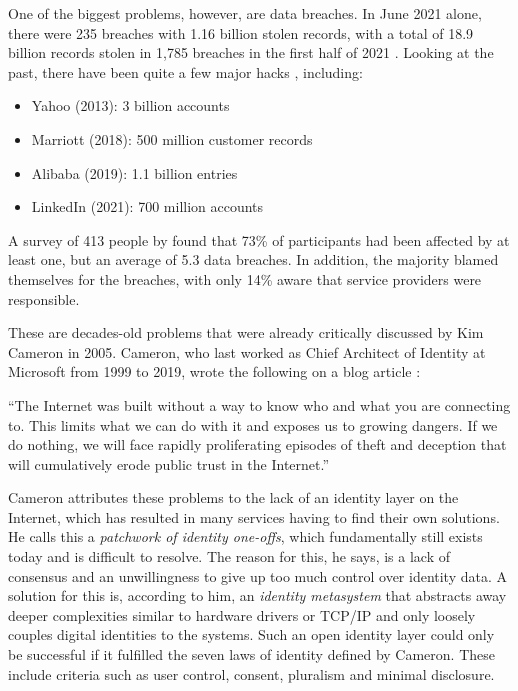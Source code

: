One of the biggest problems, however, are data breaches. In June 2021 alone, there were 235 breaches with 1.16 billion stolen records, with a total of 18.9 billion records stolen in 1,785 breaches in the first half of 2021 \cite{risk_based_security_data_2021}. Looking at the past, there have been quite a few major hacks \cite{swinhoe_15_2021}, including: 

\begin{itemize}
    \item Yahoo (2013): 3 billion accounts
    \item Marriott (2018): 500 million customer records
    \item Alibaba (2019): 1.1 billion entries
    \item LinkedIn (2021): 700 million accounts
\end{itemize}

A survey of 413 people by \cite{mayer_now_2021} found that 73\% of participants had been affected by at least one, but an average of 5.3 data breaches. In addition, the majority blamed themselves for the breaches, with only 14\% aware that service providers were responsible.

These are decades-old problems that were already critically discussed by Kim Cameron in 2005. Cameron, who last worked as Chief Architect of Identity at Microsoft from 1999 to 2019, wrote the following on a blog article \cite{cameron_laws_2005}:

\begin{displayquote}
    “The Internet was built without a way to know who and what you are connecting to. This limits what we can do with it and exposes us to growing dangers. If we do nothing, we will face rapidly proliferating episodes of theft and deception that will cumulatively erode public trust in the Internet.”
\end{displayquote}

Cameron attributes these problems to the lack of an identity layer on the Internet, which has resulted in many services having to find their own solutions. He calls this a \textit{patchwork of identity one-offs}, which fundamentally still exists today and is difficult to resolve. The reason for this, he says, is a lack of consensus and an unwillingness to give up too much control over identity data. A solution for this is, according to him, an \textit{identity metasystem} that abstracts away deeper complexities similar to hardware drivers or TCP/IP and only loosely couples digital identities to the systems.  Such an open identity layer could only be successful if it fulfilled the seven laws of identity defined by Cameron. These include criteria such as user control, consent, pluralism and minimal disclosure. \cite{cameron_laws_2005}

